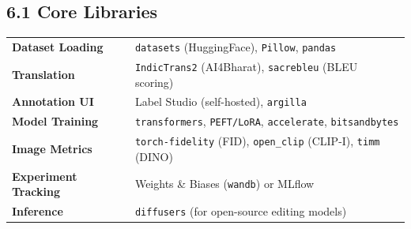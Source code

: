 \documentclass[11pt,a4paper]{article}
\begin{document}
\subsection{6.1 Core Libraries}

\begin{tabularx}{\textwidth}{>{\bfseries}lX}
\toprule
Dataset Loading & \texttt{datasets} (HuggingFace), \texttt{Pillow}, \texttt{pandas} \\
\rowcolor{lightgray}
Translation & \texttt{IndicTrans2} (AI4Bharat), \texttt{sacrebleu} (BLEU scoring) \\
Annotation UI & Label Studio (self-hosted), \texttt{argilla} \\
\rowcolor{lightgray}
Model Training & \texttt{transformers}, \texttt{PEFT/LoRA}, \texttt{accelerate}, \texttt{bitsandbytes} \\
Image Metrics & \texttt{torch-fidelity} (FID), \texttt{open\_clip} (CLIP-I), \texttt{timm} (DINO) \\
\rowcolor{lightgray}
Experiment Tracking & Weights \& Biases (\texttt{wandb}) or MLflow \\
Inference & \texttt{diffusers} (for open-source editing models) \\
\bottomrule
\end{tabularx}
\end{document}
